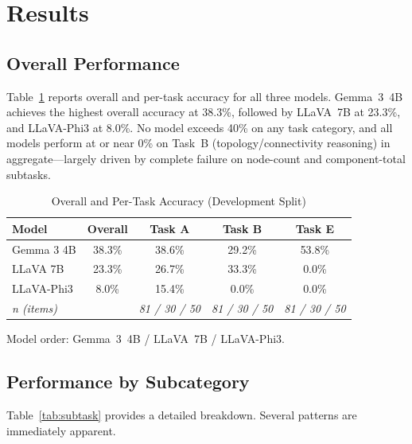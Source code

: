 \documentclass[conference]{IEEEtran}
\begin{document}
\section{Results}
\label{sec:results}

\subsection{Overall Performance}

Table~\ref{tab:overall} reports overall and per-task accuracy for all
three models.
Gemma~3~4B achieves the highest overall accuracy at 38.3\%,
followed by LLaVA~7B at 23.3\%, and LLaVA-Phi3 at 8.0\%.
No model exceeds 40\% on any task category, and all models perform
at or near 0\% on Task~B (topology/connectivity reasoning) in
aggregate---largely driven by complete failure on node-count and
component-total subtasks.

\begin{table}[t]
\centering
\caption{Overall and Per-Task Accuracy (Development Split)}
\label{tab:overall}
\begin{tabular}{lcccc}
\toprule
\textbf{Model} & \textbf{Overall} & \textbf{Task A} & \textbf{Task B} & \textbf{Task E} \\
\midrule
Gemma 3 4B  & 38.3\% & 38.6\% & 29.2\% & 53.8\% \\
LLaVA 7B    & 23.3\% & 26.7\% & 33.3\% &  0.0\% \\
LLaVA-Phi3  &  8.0\% & 15.4\% &  0.0\% &  0.0\% \\
\midrule
\textit{n (items)} & & \textit{81 / 30 / 50} & \textit{81 / 30 / 50} & \textit{81 / 30 / 50} \\
\bottomrule
\end{tabular}
\vspace{2pt}
\footnotesize{Model order: Gemma~3~4B / LLaVA~7B / LLaVA-Phi3.}
\end{table}

\subsection{Performance by Subcategory}

Table~\ref{tab:subtask} provides a detailed breakdown.
Several patterns are immediately apparent.
\end{document}
